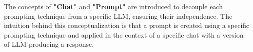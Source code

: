 The concepts of \textbf{"Chat"} and \textbf{"Prompt"} are introduced to decouple each prompting technique from a specific LLM, ensuring their independence.
The intuition behind this conceptualization is that a prompt is created using a specific prompting technique and applied in the context of a specific chat with a version of LLM producing a response.

